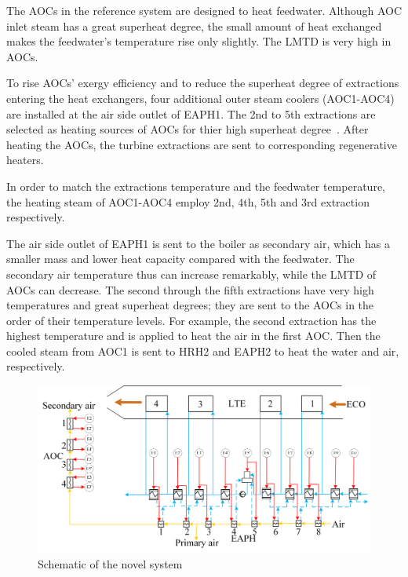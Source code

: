 \documentclass[preprint,12pt]{elsarticle}
\begin{document}
The AOCs in the reference system are designed to heat feedwater.
Although AOC inlet steam has a great superheat degree, the small amount of heat exchanged makes the feedwater's temperature rise only slightly.
The LMTD is very high in AOCs.

To rise AOCs' exergy efficiency and to reduce the superheat degree of extractions entering the heat exchangers,
four additional outer steam coolers (AOC1-AOC4) are installed at the air side outlet of EAPH1.
The 2nd to 5th extractions are selected as heating sources of AOCs for thier high superheat degree~\cite{Xu2015Optimum,Wang2016}.
After heating the AOCs, the turbine extractions are sent to corresponding regenerative heaters.

In order to match the extractions temperature and the feedwater temperature, the heating steam of AOC1-AOC4 employ 2nd, 4th, 5th and 3rd extraction respectively.   

The air side outlet of EAPH1 is sent to the boiler as secondary air, which has a smaller mass and lower heat capacity compared with the feedwater. 
The secondary air temperature thus can increase remarkably, while the LMTD of AOCs can decrease.
The second through the fifth extractions have very high temperatures and great superheat degrees; they are sent to the AOCs in the order of their temperature levels.
For example, the second extraction has the highest temperature and is applied to heat the air in the first AOC. Then the cooled steam from AOC1 is sent to HRH2 and EAPH2 to heat the water and air, respectively. 

\begin{figure}[htbp]
\centering
\includegraphics[width=1\textwidth]{fig/novel_system.png}
\caption{Schematic of the novel system} 
\label{fig:novel_system}
\end{figure}
\end{document}
